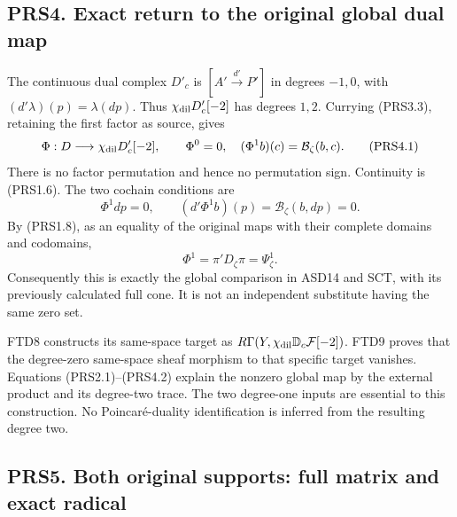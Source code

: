 \subsection{PRS4. Exact return to the original global dual
map}\label{prs4.-exact-return-to-the-original-global-dual-map}

The continuous dual complex \(D'_c\) is \([A'\xrightarrow{d'}P']\) in
degrees \(-1,0\), with \((d'\lambda)(p)=\lambda(dp)\). Thus
\(\chi_{\rm dil}D'_c[-2]\) has degrees \(1,2\). Currying (PRS3.3),
retaining the first factor as source, gives \[
\Phi:D\longrightarrow\chi_{\rm dil}D'_c[-2],\qquad
\Phi^0=0,\quad (\Phi^1b)(c)=\mathcal B_\zeta(b,c).
\tag{PRS4.1}
\] There is no factor permutation and hence no permutation sign.
Continuity is (PRS1.6). The two cochain conditions are \[
\Phi^1dp=0,\qquad (d'\Phi^1b)(p)=\mathcal B_\zeta(b,dp)=0.
\] By (PRS1.8), as an equality of the original maps with their complete
domains and codomains, \[
\boxed{\Phi^1=\pi'D_\zeta\pi=\Psi_\zeta^1.}
\tag{PRS4.2}
\] Consequently this is exactly the global comparison in ASD14 and SCT,
with its previously calculated full cone. It is not an independent
substitute having the same zero set.

FTD8 constructs its same-space target as
\(R\Gamma(Y,\chi_{\rm dil}\mathbb D_c\mathcal F[-2])\). FTD9 proves that
the degree-zero same-space sheaf morphism to that specific target
vanishes. Equations (PRS2.1)--(PRS4.2) explain the nonzero global map by
the external product and its degree-two trace. The two degree-one inputs
are essential to this construction. No Poincaré-duality identification
is inferred from the resulting degree two.

\subsection{PRS5. Both original supports: full matrix and exact
radical}\label{prs5.-both-original-supports-full-matrix-and-exact-radical}

